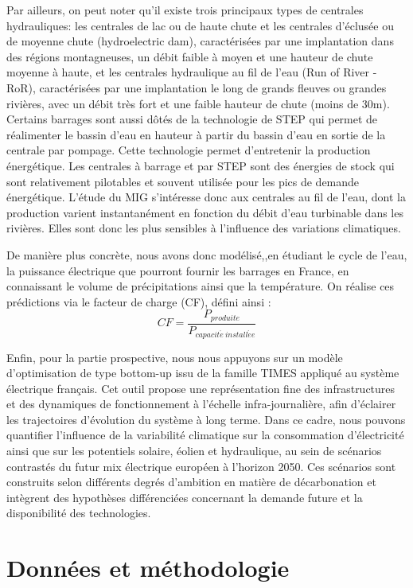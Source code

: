 \documentclass{article}
\theoremstyle{nopointbreak}
\theoremstyle{nobrkbold}
\begin{document}
Par ailleurs, on peut noter qu'il existe trois principaux types de centrales hydrauliques: les centrales de lac ou de haute chute et les centrales d'éclusée ou de moyenne chute (hydroelectric dam), caractérisées par une implantation dans des régions montagneuses, un débit faible à moyen et une hauteur de chute moyenne à haute, et les centrales hydraulique au fil de l'eau (Run of River - RoR), caractérisées par une implantation le long de grands fleuves ou grandes rivières, avec un débit très fort et une faible hauteur de chute (moins de 30m). Certains barrages sont aussi dôtés de la technologie de STEP qui permet de réalimenter le bassin d'eau en hauteur à partir du bassin d'eau en sortie de la centrale par pompage. Cette technologie permet d'entretenir la production énergétique. Les centrales à barrage et par STEP sont des énergies de stock qui sont relativement pilotables et souvent utilisée pour les pics de demande énergétique. L'étude du MIG s'intéresse donc aux centrales au fil de l'eau, dont la production varient instantanément en fonction du débit d'eau turbinable dans les rivières. Elles sont donc les plus sensibles à l'influence des variations climatiques. 


De manière plus concrète, nous avons donc modélisé,,en étudiant le cycle de l'eau, la puissance électrique que pourront fournir les barrages en France, en connaissant le volume de précipitations ainsi que la température. On réalise ces prédictions via le facteur de charge (CF), défini ainsi : \\ $$ CF = \frac{P_{produite}}{P_{capacit\acute e \ install\acute ee}}$$

Enfin, pour la partie prospective, nous nous appuyons sur un modèle d’optimisation de type bottom-up issu de la famille TIMES appliqué au système électrique français. Cet outil propose une représentation fine des infrastructures et des dynamiques de fonctionnement à l’échelle infra-journalière, afin d’éclairer les trajectoires d’évolution du système à long terme. Dans ce cadre, nous pouvons quantifier l’influence de la variabilité climatique sur la consommation d’électricité ainsi que sur les potentiels solaire, éolien et hydraulique, au sein de scénarios contrastés du futur mix électrique européen à l’horizon 2050. Ces scénarios sont construits selon différents degrés d’ambition en matière de décarbonation et intègrent des hypothèses différenciées concernant la demande future et la disponibilité des technologies.


\section{Données et méthodologie }
\end{document}
